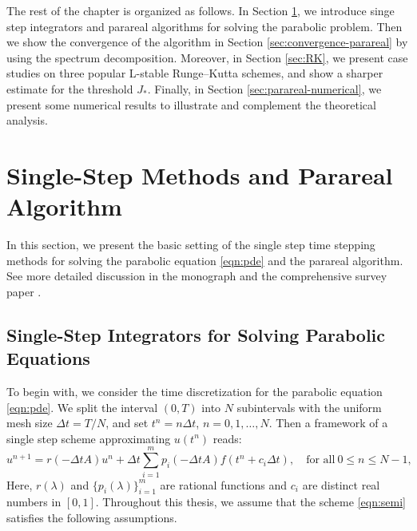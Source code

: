 \documentclass[a4paper, oneside]{book}
\begin{document}
The rest of the chapter is organized as follows. In Section \ref{sec:parareal}, we introduce singe step integrators
and parareal algorithms for solving the parabolic problem.
Then we show the convergence of the algorithm in Section  \ref{sec:convergence-parareal}
by using the spectrum decomposition.
Moreover, in Section \ref{sec:RK}, we present case studies on three popular L-stable Runge--Kutta schemes, and show a sharper estimate for
the threshold $J_*$. Finally, in Section \ref{sec:parareal-numerical}, we present some numerical results to illustrate and complement the theoretical analysis.



\section{Single-Step Methods and Parareal Algorithm}\label{sec:parareal}
In this section, we present the basic setting of the single step time stepping methods for solving the parabolic equation \eqref{eqn:pde}
and the parareal algorithm. See more detailed discussion in the monograph \cite[Chapter 7-9]{Thomee:2006}
and the comprehensive survey paper \cite{Gander:2015}.

\subsection{Single-Step Integrators for Solving Parabolic Equations}
To begin with, we consider the time discretization for the parabolic equation \eqref{eqn:pde}.
We split the interval $(0,T)$ into $N$ subintervals with the uniform mesh size ${\Delta t}=T/N$,
and set $t^n = n{\Delta t}$, $n=0,1,\ldots,N$.
Then a framework of a single step scheme approximating $u(t^n)$ reads:
\begin{equation}\label{eqn:semi}
  u^{n+1} = r(-{\Delta t} A) u^{n} + {\Delta t} \sum_{i=1}^m p_i(-{\Delta t} A)
  f(t^n+c_i\Delta t) ,\quad \text{for all}~0\le n\le N-1,
\end{equation}
Here, $r(\lambda)$ and $\{p_i(\lambda)\}^m_{i=1}$ are rational functions and $c_i$ are distinct real numbers in $[0,1]$.
Throughout this thesis, we assume that the scheme \eqref{eqn:semi} satisfies the following assumptions.\vskip10pt
\end{document}
